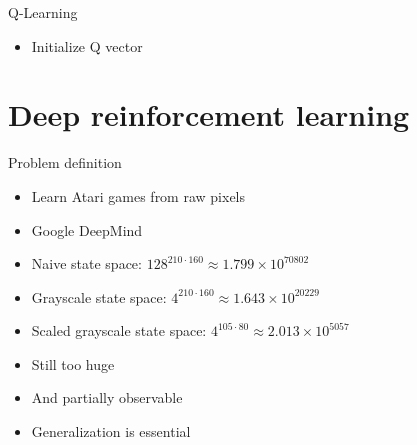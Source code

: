 \documentclass{beamer}
\begin{document}
\begin{frame}{Q-Learning}
  \begin{itemize}
    \item Initialize Q vector
  \end{itemize}
\end{frame}

\section{Deep reinforcement learning}

\begin{frame}{Problem definition}
  \begin{itemize}
  \item {
    Learn Atari games from raw pixels
  }
  \item {
    Google DeepMind
  }
  \item {
      Naive state space: $128^{210 \cdot 160} \approx 1.799\times 10^{70802}$
  }
  \item {
      Grayscale state space: $4^{210 \cdot 160} \approx 1.643\times 10^{20229}$
  }
  \item {
      Scaled grayscale state space: $4^{105 \cdot 80} \approx 2.013\times 10^{5057}$
  }
  \item {
    Still too huge
  }
  \item {
    And partially observable
  }
  \item {
    Generalization is essential
  }
  \end{itemize}
\end{frame}
\end{document}
